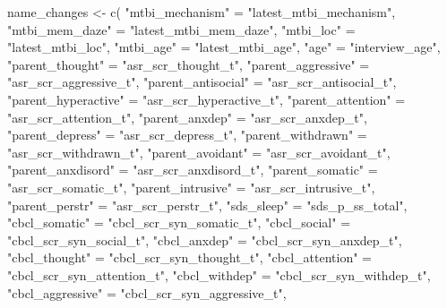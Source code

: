 \documentclass[
  letterpaper,
  DIV=11,
  numbers=noendperiod]{scrreprt}
\newenvironment{Shaded}{\begin{snugshade}}{\end{snugshade}}
\newcommand{\FunctionTok}[1]{\textcolor[rgb]{0.28,0.35,0.67}{#1}}
\newcommand{\NormalTok}[1]{\textcolor[rgb]{0.00,0.23,0.31}{#1}}
\newcommand{\OtherTok}[1]{\textcolor[rgb]{0.00,0.23,0.31}{#1}}
\newcommand{\StringTok}[1]{\textcolor[rgb]{0.13,0.47,0.30}{#1}}
\begin{document}
\begin{Shaded}
\begin{Highlighting}[]
\NormalTok{name\_changes }\OtherTok{\textless{}{-}} \FunctionTok{c}\NormalTok{(}
    \StringTok{"mtbi\_mechanism"} \OtherTok{=} \StringTok{"latest\_mtbi\_mechanism"}\NormalTok{,}
    \StringTok{"mtbi\_mem\_daze"} \OtherTok{=} \StringTok{"latest\_mtbi\_mem\_daze"}\NormalTok{,}
    \StringTok{"mtbi\_loc"} \OtherTok{=} \StringTok{"latest\_mtbi\_loc"}\NormalTok{,}
    \StringTok{"mtbi\_age"} \OtherTok{=} \StringTok{"latest\_mtbi\_age"}\NormalTok{,}
    \StringTok{"age"} \OtherTok{=} \StringTok{"interview\_age"}\NormalTok{,}
    \StringTok{"parent\_thought"} \OtherTok{=} \StringTok{"asr\_scr\_thought\_t"}\NormalTok{,}
    \StringTok{"parent\_aggressive"} \OtherTok{=} \StringTok{"asr\_scr\_aggressive\_t"}\NormalTok{,}
    \StringTok{"parent\_antisocial"} \OtherTok{=} \StringTok{"asr\_scr\_antisocial\_t"}\NormalTok{,}
    \StringTok{"parent\_hyperactive"} \OtherTok{=} \StringTok{"asr\_scr\_hyperactive\_t"}\NormalTok{,}
    \StringTok{"parent\_attention"} \OtherTok{=} \StringTok{"asr\_scr\_attention\_t"}\NormalTok{,}
    \StringTok{"parent\_anxdep"} \OtherTok{=} \StringTok{"asr\_scr\_anxdep\_t"}\NormalTok{,}
    \StringTok{"parent\_depress"} \OtherTok{=} \StringTok{"asr\_scr\_depress\_t"}\NormalTok{,}
    \StringTok{"parent\_withdrawn"} \OtherTok{=} \StringTok{"asr\_scr\_withdrawn\_t"}\NormalTok{,}
    \StringTok{"parent\_avoidant"} \OtherTok{=} \StringTok{"asr\_scr\_avoidant\_t"}\NormalTok{,}
    \StringTok{"parent\_anxdisord"} \OtherTok{=} \StringTok{"asr\_scr\_anxdisord\_t"}\NormalTok{,}
    \StringTok{"parent\_somatic"} \OtherTok{=} \StringTok{"asr\_scr\_somatic\_t"}\NormalTok{,}
    \StringTok{"parent\_intrusive"} \OtherTok{=} \StringTok{"asr\_scr\_intrusive\_t"}\NormalTok{,}
    \StringTok{"parent\_perstr"} \OtherTok{=} \StringTok{"asr\_scr\_perstr\_t"}\NormalTok{,}
    \StringTok{"sds\_sleep"} \OtherTok{=} \StringTok{"sds\_p\_ss\_total"}\NormalTok{,}
    \StringTok{"cbcl\_somatic"} \OtherTok{=} \StringTok{"cbcl\_scr\_syn\_somatic\_t"}\NormalTok{,}
    \StringTok{"cbcl\_social"} \OtherTok{=} \StringTok{"cbcl\_scr\_syn\_social\_t"}\NormalTok{,}
    \StringTok{"cbcl\_anxdep"} \OtherTok{=} \StringTok{"cbcl\_scr\_syn\_anxdep\_t"}\NormalTok{,}
    \StringTok{"cbcl\_thought"} \OtherTok{=} \StringTok{"cbcl\_scr\_syn\_thought\_t"}\NormalTok{,}
    \StringTok{"cbcl\_attention"} \OtherTok{=} \StringTok{"cbcl\_scr\_syn\_attention\_t"}\NormalTok{,}
    \StringTok{"cbcl\_withdep"} \OtherTok{=} \StringTok{"cbcl\_scr\_syn\_withdep\_t"}\NormalTok{,}
    \StringTok{"cbcl\_aggressive"} \OtherTok{=} \StringTok{"cbcl\_scr\_syn\_aggressive\_t"}\NormalTok{,}

\end{Highlighting}
\end{Shaded}
\end{document}
